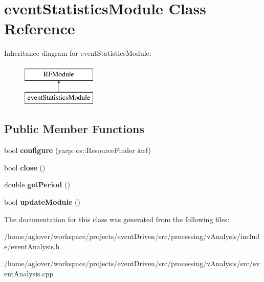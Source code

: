 \hypertarget{classeventStatisticsModule}{\section{event\-Statistics\-Module Class Reference}
\label{classeventStatisticsModule}
}
Inheritance diagram for event\-Statistics\-Module\-:\begin{figure}[H]
\begin{center}
\leavevmode
\includegraphics[height=2.000000cm]{classeventStatisticsModule}
\end{center}
\end{figure}
\subsection*{Public Member Functions}
\begin{DoxyCompactItemize}
\item 
\hypertarget{classeventStatisticsModule_a1ca7b5499ca668297430d3976ce3b1d1}{bool {\bfseries configure} (yarp\-::os\-::\-Resource\-Finder \&rf)}\label{classeventStatisticsModule_a1ca7b5499ca668297430d3976ce3b1d1}

\item 
\hypertarget{classeventStatisticsModule_ab11f4b9fdd8ec0d8f3aa0bcb415fef9c}{bool {\bfseries close} ()}\label{classeventStatisticsModule_ab11f4b9fdd8ec0d8f3aa0bcb415fef9c}

\item 
\hypertarget{classeventStatisticsModule_a7e1825323f24dd316be0f7cb7eac80d2}{double {\bfseries get\-Period} ()}\label{classeventStatisticsModule_a7e1825323f24dd316be0f7cb7eac80d2}

\item 
\hypertarget{classeventStatisticsModule_a08194f3ae070dc20ef93a403644ab5a6}{bool {\bfseries update\-Module} ()}\label{classeventStatisticsModule_a08194f3ae070dc20ef93a403644ab5a6}

\end{DoxyCompactItemize}


The documentation for this class was generated from the following files\-:\begin{DoxyCompactItemize}
\item 
/home/aglover/workspace/projects/event\-Driven/src/processing/v\-Analysis/include/event\-Analysis.\-h\item 
/home/aglover/workspace/projects/event\-Driven/src/processing/v\-Analysis/src/event\-Analysis.\-cpp\end{DoxyCompactItemize}
